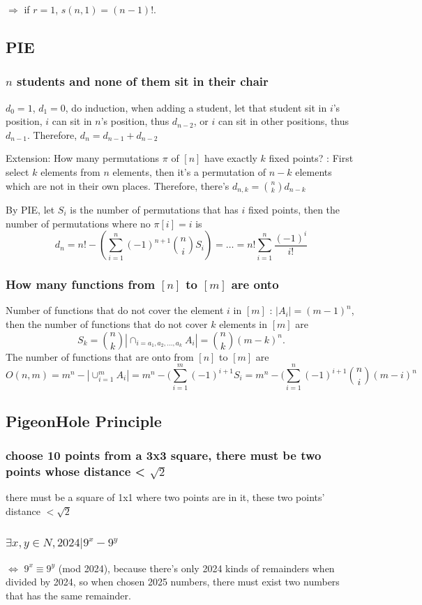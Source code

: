 \documentclass[12pt,a4paper]{ctexrep}
\begin{document}
$\Rightarrow$ if $r=1$, $s(n,1)=(n-1)!$.

\subsection{PIE}
\subsubsection{$n$ students and none of them sit in their chair}
$d_0=1$, $d_1=0$, do induction, when adding a student, let that student sit in $i$'s position, $i$ can sit in $n$'s position, thus $d_{n-2}$, or $i$ can sit in other positions, thus $d_{n-1}$. Therefore, $d_n=d_{n-1}+d_{n-2}$

Extension: How many permutations $\pi$ of $[n]$ have exactly $k$ fixed points? : First select $k$ elements from $n$ elements, then it's a permutation of $n-k$ elements which are not in their own places. Therefore, there's $d_{n,k}=\binom{n}{k} d_{n-k}$

By PIE, let $S_i$ is the number of permutations that has $i$ fixed points, then the number of permutations where no $\pi[i]=i$ is \[d_n=n! - (\sum_{i=1}^n (-1)^{n+1}\binom{n}{i} S_i) = \dots = n! \sum_{i=1}^n \frac{(-1)^{i}}{i!}\]

\subsubsection{How many functions from $[n]$ to $[m]$ are onto}
Number of functions that do not cover the element $i$ in $[m]$ : $|A_i| = (m-1)^n$, then the number of functions that do not cover $k$ elements in $[m]$ are \[S_k = \binom{n}{k} |\cap_{i=a_1,a_2,\dots,a_k} A_i| = \binom{n}{k} (m-k)^n.\] The number of functions that are onto from $[n]$ to $[m]$ are \[O(n,m) = m^n-|\cup_{i=1}^m A_i| = m^n-(\sum_{i=1}^m (-1)^{i+1} S_i = m^n-(\sum_{i=1}^n (-1)^{i+1} \binom{n}{i}(m-i)^n\]

\subsection{PigeonHole Principle}
\subsubsection{choose 10 points from a 3x3 square, there must be two points whose distance < $\sqrt{2}$}
there must be a square of 1x1 where two points are in it, these two points' distance $< \sqrt{2}$
\subsubsection{$\exists x,y \in N, 2024|9^x-9^y$}
$\iff$ $9^x \equiv 9^y$ (mod 2024), because there's only 2024 kinds of remainders when divided by 2024, so when chosen 2025 numbers, there must exist two numbers that has the same remainder.
\end{document}
